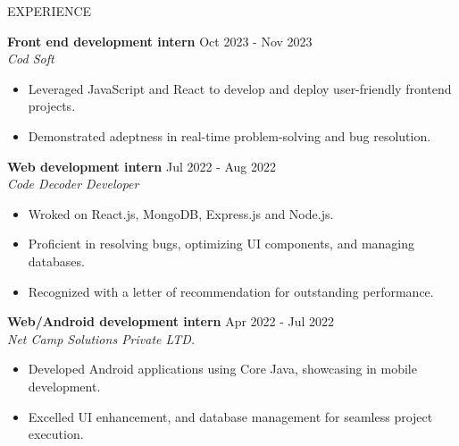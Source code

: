 \documentclass{resume} %
\begin{document}
\begin{rSection}{\large E\small XPERIENCE}

\textbf{Front end development intern} \hfill Oct 2023 - Nov 2023\\
\textit{Cod Soft}
 \begin{itemize}
    \itemsep -2pt {} 
     \item Leveraged JavaScript and React to develop and deploy user-friendly frontend projects.
     \item Demonstrated adeptness in real-time problem-solving and bug resolution.
 \end{itemize}
 
\textbf{Web development intern} \hfill Jul 2022 - Aug 2022\\ \textit{Code Decoder Developer}
 \begin{itemize}
    \itemsep -3pt {} 
     \item Wroked on React.js, MongoDB, Express.js and Node.js.
     \item Proficient in resolving bugs, optimizing UI components, and managing databases.
    \item Recognized with a letter of recommendation for outstanding performance.
 \end{itemize}
 
\textbf{Web/Android development intern} \hfill Apr 2022 - Jul 2022\\ \textit{Net Camp Solutions Private LTD.}
 \begin{itemize}
    \itemsep -2pt {} 
     \item Developed Android applications using Core Java, showcasing in mobile development.
     \item Excelled UI enhancement, and database management for seamless project execution.
 \end{itemize}

\end{rSection} 

\end{document}
